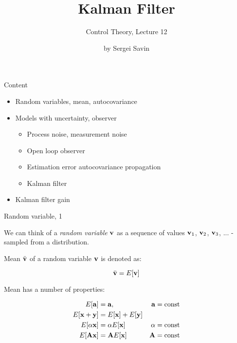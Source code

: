 \documentclass{beamer}
\title{Kalman Filter}
\subtitle{Control Theory, Lecture 12}
\author{by Sergei Savin}
\date{\mydate}
\begin{document}
\maketitle



\begin{frame}{Content}
\begin{itemize}
\item Random variables, mean, autocovariance
\item Models with uncertainty, observer
\begin{itemize}
	\item Process noise, measurement noise
	\item Open loop observer
	\item Estimation error autocovariance propagation
	\item Kalman filter
\end{itemize}
\item Kalman filter gain
\end{itemize}
\end{frame}




\begin{frame}{Random variable, 1}
\begin{flushleft}

We can think of a \emph{random variable} $\mathbf{v}$ as a sequence of values $\mathbf{v}_1$, $\mathbf{v}_2$, $\mathbf{v}_3$, ... - sampled from a distribution.

\bigskip

Mean $\bar{\mathbf{v}}$ of a random variable $\mathbf{v}$ is denoted as:

\begin{equation}
	\bar{\mathbf{v}} = E[\mathbf{v}]
\end{equation}

Mean has a number of properties:

\begin{align}
	E[\mathbf{a}] &= \mathbf{a}, & \mathbf{a}= \text{const} \\
	E[\mathbf{x}+\mathbf{y}] &= E[\mathbf{x}] + E[\mathbf{y}] &\\
	E[\alpha \mathbf{x}] &= \alpha  E[\mathbf{x}]  & \alpha = \text{const}\\
	E[\mathbf{A} \mathbf{x}] &= \mathbf{A}  E[\mathbf{x}] & \mathbf{A} = \text{const}
\end{align}


\end{flushleft}
\end{frame}
\end{document}
